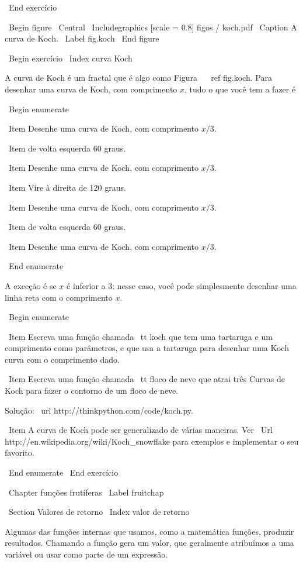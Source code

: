 \documentclass[10pt]{book}
\begin{document}
{{{\ End {} exercício


\ Begin {figure}
\ Central
{\ Includegraphics [scale = 0.8] {figos / koch.pdf}}
\ Caption {A curva de Koch.}
\ Label {} fig.koch
\ End {figure}

\ Begin {} exercício
\ Index {curva Koch}

A curva de Koch é um fractal que é algo como
Figura ~ \ ref {} fig.koch. Para desenhar uma curva de Koch, com comprimento $ x $, tudo o que você
tem a fazer é

\ Begin {enumerate}

\ Item Desenhe uma curva de Koch, com comprimento $ x / 3 $.

\ Item de volta esquerda 60 graus.

\ Item Desenhe uma curva de Koch, com comprimento $ x / 3 $.

\ Item Vire à direita de 120 graus.

\ Item Desenhe uma curva de Koch, com comprimento $ x / 3 $.

\ Item de volta esquerda 60 graus.

\ Item Desenhe uma curva de Koch, com comprimento $ x / 3 $.

\ End {enumerate}

A exceção é se $ x $ é inferior a 3: nesse caso,
você pode simplesmente desenhar uma linha reta com o comprimento $ x $.

\ Begin {enumerate}

\ Item Escreva uma função chamada {\ tt koch} que tem uma tartaruga e
um comprimento como parâmetros, e que usa a tartaruga para desenhar uma Koch
curva com o comprimento dado.

\ Item Escreva uma função chamada {\ tt} floco de neve que atrai três
Curvas de Koch para fazer o contorno de um floco de neve.

Solução: \ url {http://thinkpython.com/code/koch.py}.

\ Item A curva de Koch pode ser generalizado de várias maneiras. Ver
\ Url {} http://en.wikipedia.org/wiki/Koch_snowflake para exemplos e
implementar o seu favorito.

\ End {enumerate}
\ End {} exercício


\ Chapter {funções frutíferas}
\ Label {} fruitchap

\ Section {Valores de retorno}
\ Index {valor de retorno}

Algumas das funções internas que usamos, como a matemática
funções, produzir resultados. Chamando a função gera um
valor, que geralmente atribuímos a uma variável ou usar como parte de um
expressão.

}}}
\end{document}
